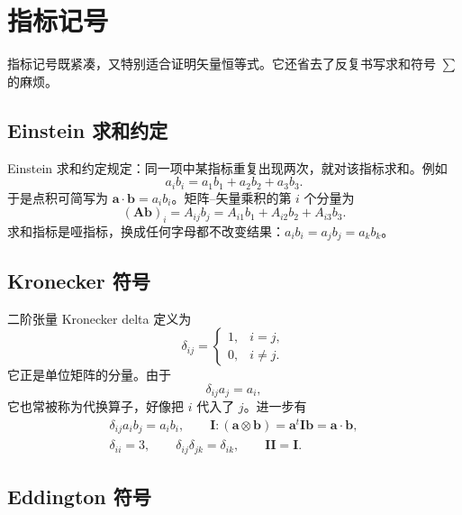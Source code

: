 \documentclass[11pt,a4paper,openany,fontset=none]{ctexbook}
\begin{document}
\section{指标记号}

指标记号既紧凑，又特别适合证明矢量恒等式。它还省去了反复书写求和符号 $\sum$ 的麻烦。

\subsection{Einstein 求和约定}

Einstein 求和约定规定：同一项中某指标重复出现两次，就对该指标求和。例如
\begin{equation}
 a_ib_i=a_1b_1+a_2b_2+a_3b_3. \tag{1.4.1}
\end{equation}
于是点积可简写为 $\bm a\cdot\bm b=a_ib_i$。矩阵--矢量乘积的第 $i$ 个分量为
\begin{equation}
 (\bm A\bm b)_i=A_{ij}b_j=A_{i1}b_1+A_{i2}b_2+A_{i3}b_3. \tag{1.4.2}
\end{equation}
求和指标是哑指标，换成任何字母都不改变结果：$a_ib_i=a_jb_j=a_kb_k$。

\subsection{Kronecker 符号}

二阶张量 Kronecker delta 定义为
\begin{equation}
 \delta_{ij}=\begin{cases}1,&i=j,\\0,&i\ne j.\end{cases} \tag{1.4.5}
\end{equation}
它正是单位矩阵的分量。由于
\begin{equation}
 \delta_{ij}a_j=a_i, \tag{1.4.7}
\end{equation}
它也常被称为代换算子，好像把 $i$ 代入了 $j$。进一步有
\begin{gather}
 \delta_{ij}a_ib_j=a_ib_i,\qquad \bm I:(\bm a\otimes\bm b)=\bm a^t\bm I\bm b=\bm a\cdot\bm b, \tag{1.4.8--9}\\
 \delta_{ii}=3,\qquad \delta_{ij}\delta_{jk}=\delta_{ik},\qquad \bm I\bm I=\bm I. \tag{1.4.10--12}
\end{gather}

\subsection{Eddington 符号}
\end{document}
